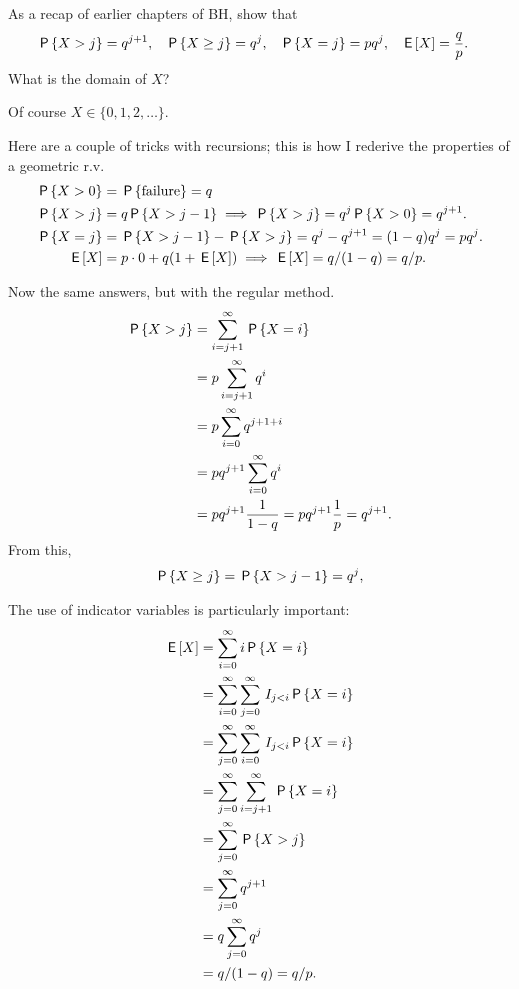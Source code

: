 \documentclass[a4paper,11pt]{article}
\begin{document}
\begin{exercise}
As a recap of earlier chapters of BH, show that
\begin{align}
  \label{eq:9}
\P{X>j} &= q^{j+1}, &\P{X\geq j} &=q^j, & \P{X=j} &= pq^{j}, & \E{X}&=\frac q{p}.
 \end{align}
What is the domain of $X$?
\begin{solution}
Of course $X \in \{0, 1, 2, \ldots\}$.

Here are a couple of tricks with recursions; this is how I rederive the properties of a geometric r.v.
\begin{align}
  \label{eq:8}
\P{X>0} &= \P{\textrm{failure}} = q\\
\P{X>j} &= q \P{X>j-1} \implies \P{X>j}=q^{j}\P{X>0} = q^{j+1}.\\
\P{X=j} &= \P{X>j-1} - \P{X>j} = q^{j}-q^{j+1} = (1-q)q^{j} = p q^{j}.\\
\E X &= p\cdot 0 + q(1+\E X) \implies \E X = q/(1-q) = q/p.
\end{align}

Now the same answers, but with the regular method. 
  \begin{align}
    \label{eq:5}
\P{X>j}    
&= \sum_{i=j+1}^{\infty} \P{X=i} \\
&= p\sum_{i=j+1}^{\infty} q^{i} \\
&= p\sum_{i=0}^{\infty} q^{j+1+i} \\
&= pq^{j+1}\sum_{i=0}^{\infty} q^{i} \\
&= pq^{j+1}\frac 1 {1-q} = p q^{j+1} \frac 1 p = q^{j+1}.
  \end{align}
From this,
  \begin{align}
    \label{eq:56}
  \P{X\geq j}  &= \P{X>j-1} = q^{j}, \\
  \end{align}

The use of indicator variables is particularly important:
  \begin{align}
    \label{eq:58}
\E X 
&= \sum_{i=0}^{\infty} i\P{X=i} \\
&=  \sum_{i=0}^{\infty} \sum_{j=0}^{\infty} \1{j<i} \P{X=i} \\
&=  \sum_{j=0}^{\infty} \sum_{i=0}^{\infty} \1{j<i} \P{X=i} \\
&=  \sum_{j=0}^{\infty} \sum_{i=j+1}^{\infty}  \P{X=i} \\
&=  \sum_{j=0}^{\infty}  \P{X>j} \\
&=  \sum_{j=0}^{\infty}  q^{j+1}\\
&=  q \sum_{j=0}^{\infty}  q^{j}\\
&=  q/(1-q) = q/p.
  \end{align}

\end{solution}
\end{exercise}
\end{document}

